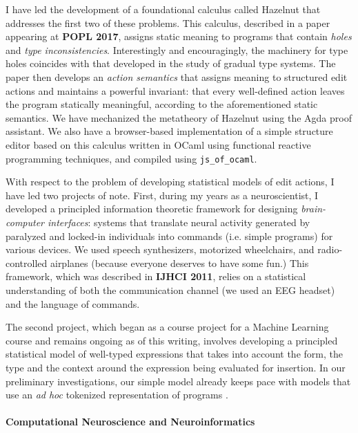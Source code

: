 \documentclass[9pt]{extarticle}
\let\li\lstinline
\begin{document}
I have led the development of a foundational calculus called Hazelnut that addresses the first two of these problems. This calculus, described in a paper appearing at \textbf{POPL 2017}, assigns static meaning to programs that contain \emph{holes} and \emph{type inconsistencies}. Interestingly and encouragingly, the machinery for type holes coincides with that developed in the study of gradual type systems. The paper then develops an \emph{action semantics} that assigns meaning to structured edit actions and maintains a powerful invariant: that every well-defined action leaves the program statically meaningful, according to the aforementioned static semantics. We have mechanized the metatheory of Hazelnut using the Agda proof assistant. We also have a browser-based implementation of a simple {structure editor} based on this calculus written in OCaml using functional reactive programming techniques, and compiled using \li{js_of_ocaml}.

With respect to the problem of developing statistical models of edit actions, I have led two projects of note. 
First, during my years as a neuroscientist, I developed a principled information theoretic framework for designing \emph{brain-computer interfaces}:  systems that translate neural activity generated by paralyzed and locked-in individuals into commands (i.e. simple programs) for various devices. We used speech synthesizers, motorized wheelchairs, and radio-controlled airplanes (because everyone deserves to have some fun.) This framework, which was described in \textbf{IJHCI 2011}, relies on a statistical understanding of both the communication channel (we used an EEG headset) and  the language of commands.

The second project, which began as a course project for a Machine Learning course and remains ongoing as of this writing, involves developing a principled statistical model of well-typed expressions that takes into account the form, the type and the context around the expression being evaluated for insertion. In our preliminary investigations, our simple model already keeps pace with models that use an \emph{ad hoc} tokenized representation of programs \cite{icse-naturalness12}.

\vspace{-8px}
\paragraph{Computational Neuroscience and Neuroinformatics}
\end{document}
